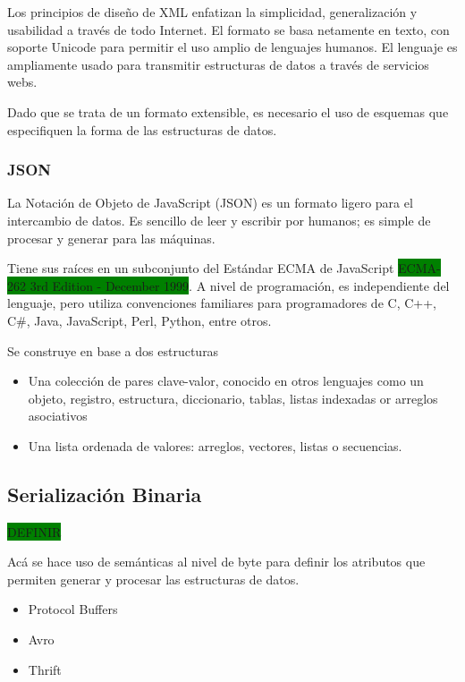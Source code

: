 Los principios de diseño de XML enfatizan la simplicidad, generalización y usabilidad a través de todo Internet. El formato se basa netamente en texto, con soporte Unicode para permitir el uso amplio de lenguajes humanos. El lenguaje es ampliamente usado para transmitir estructuras de datos a través de servicios webs.

Dado que se trata de un formato extensible, es necesario el uso de esquemas que especifiquen la forma de las estructuras de datos.

\subsubsection{JSON}

La Notación de Objeto de JavaScript (JSON) es un formato ligero para el intercambio de datos. Es sencillo de leer y escribir por humanos; es simple de procesar y generar para las máquinas.

Tiene sus raíces en un subconjunto del Estándar ECMA de JavaScript \colorbox{green}{ECMA-262 3rd Edition - December 1999}. A nivel de programación, es independiente del lenguaje, pero utiliza convenciones familiares para programadores de C, C++, C\#, Java, JavaScript, Perl, Python, entre otros.

Se construye en base a dos estructuras

\begin{itemize}
  \item Una colección de pares clave-valor, conocido en otros lenguajes como un objeto, registro, estructura, diccionario, tablas, listas indexadas or arreglos asociativos
  \item Una lista ordenada de valores: arreglos, vectores, listas o secuencias.
\end{itemize}

\subsection{Serialización Binaria}
\colorbox{green}{DEFINIR}

Acá se hace uso de semánticas al nivel de byte para definir los atributos que permiten generar y procesar las estructuras de datos.

\begin{itemize}
  \item Protocol Buffers
  \item Avro
  \item Thrift
\end{itemize}

